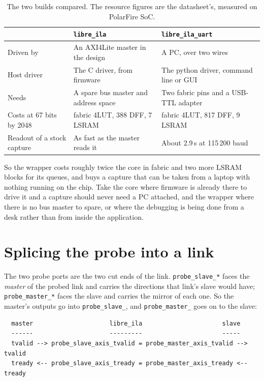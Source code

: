 \documentclass[../manual.tex]{subfiles}
\begin{document}
\begin{table}[H]
    \centering
    \begin{tabularx}{\textwidth}{|l|>{\raggedright\arraybackslash}X|>{\raggedright\arraybackslash}X|}
        \hline
        \rowcolor{gray!40} & \texttt{libre\_ila} & \texttt{libre\_ila\_uart} \\
        \hline
        Driven by & An AXI4Lite master in the design & A PC, over two wires \\
        \hline
        Host driver & The C driver, from firmware & The python driver, command line or GUI \\
        \hline
        Needs & A spare bus master and address space & Two fabric pins and a USB-TTL adapter \\
        \hline
        Costs at 67 bits by 2048 & 600 fabric 4LUT, 388 DFF, 7 LSRAM & 1280 fabric 4LUT, 817 DFF, 9 LSRAM \\
        \hline
        Readout of a stock capture & As fast as the master reads it & About 2.9\,s at 115\,200 baud \\
        \hline
    \end{tabularx}
    \caption{The two builds compared. The resource figures are the datasheet's, measured on PolarFire SoC.}
    \label{tab:integ_which}
\end{table}

So the wrapper costs roughly twice the core in fabric and two more LSRAM blocks for its queues, and buys a capture that can be taken from a laptop with nothing running on the chip. Take the core where firmware is already there to drive it and a capture should never need a PC attached, and the wrapper where there is no bus master to spare, or where the debugging is being done from a desk rather than from inside the application.

\section{Splicing the probe into a link}
\label{sec:integ_splice}

The two probe ports are the two cut ends of the link. \texttt{probe\_slave\_*} faces the \emph{master} of the probed link and carries the directions that link's slave would have; \texttt{probe\_master\_*} faces the slave and carries the mirror of each one. So the master's outputs go into \texttt{probe\_slave\_}, and \texttt{probe\_master\_} goes on to the slave:

\begin{lstlisting}
  master                     libre_ila                      slave
  ------                     ---------                      -----
  tvalid --> probe_slave_axis_tvalid = probe_master_axis_tvalid --> tvalid
  tready <-- probe_slave_axis_tready = probe_master_axis_tready <-- tready
\end{lstlisting}
\end{document}
